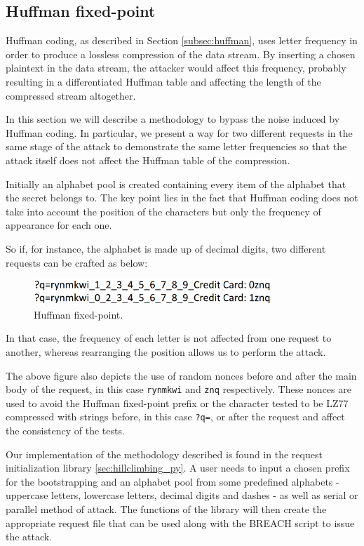 \subsection{Huffman fixed-point}

Huffman coding, as described in Section \ref{subsec:huffman}, uses letter
frequency in order to produce a lossless compression of the data stream. By
inserting a chosen plaintext in the data stream, the attacker would affect this
frequency, probably resulting in a differentiated Huffman table and affecting
the length of the compressed stream altogether.

In this section we will describe a methodology to bypass the noise induced by
Huffman coding. In particular, we present a way for two different requests in
the same stage of the attack to demonstrate the same letter frequencies so
that the attack itself does not affect the Huffman table of the compression.

Initially an alphabet pool is created containing every item of the alphabet that
the secret belongs to. The key point lies in the fact that Huffman coding does
not take into account the position of the characters but only the frequency of
appearance for each one.

So if, for instance, the alphabet is made up of decimal digits, two different
requests can be crafted as below:

\begin{figure}[H] \caption{Huffman fixed-point.} \centering
\includegraphics[width=0.8\textwidth]{diagrams/huffman_fixed_point.png}\end{figure}

In that case, the frequency of each letter is not affected from one request to
another, whereas rearranging the position allows us to perform the attack.

The above figure also depicts the use of random nonces before and after the main
body of the request, in this case \texttt{rynmkwi} and \texttt{znq}
respectively. These nonces are used to avoid the Huffman fixed-point prefix or
the character tested to be LZ77 compressed with strings before, in this case
\texttt{?q=}, or after the request and affect the consistency of the tests.

Our implementation of the methodology described is found in the request
initialization library \ref{sec:hillclimbing_py}. A user needs to input a chosen
prefix for the bootstrapping and an alphabet pool from some predefined alphabets
- uppercase letters, lowercase letters, decimal digits and dashes - as well as
serial or parallel method of attack. The functions of the library will then
create the appropriate request file that can be used along with the BREACH
script to issue the attack.


